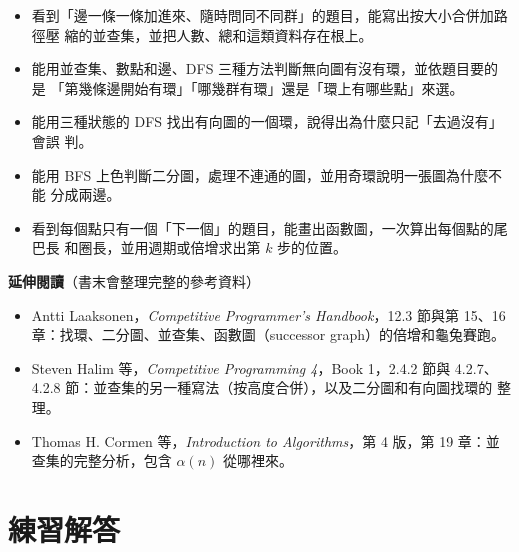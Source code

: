\begin{itemize}
\item 看到「邊一條一條加進來、隨時問同不同群」的題目，能寫出按大小合併加路徑壓
縮的並查集，並把人數、總和這類資料存在根上。
\item 能用並查集、數點和邊、DFS 三種方法判斷無向圖有沒有環，並依題目要的是
「第幾條邊開始有環」「哪幾群有環」還是「環上有哪些點」來選。
\item 能用三種狀態的 DFS 找出有向圖的一個環，說得出為什麼只記「去過沒有」會誤
判。
\item 能用 BFS 上色判斷二分圖，處理不連通的圖，並用奇環說明一張圖為什麼不能
分成兩邊。
\item 看到每個點只有一個「下一個」的題目，能畫出函數圖，一次算出每個點的尾巴長
和圈長，並用週期或倍增求出第 $k$ 步的位置。
\end{itemize}

\textbf{延伸閱讀}（書末會整理完整的參考資料）

\begin{itemize}
\item Antti Laaksonen，\textit{Competitive Programmer's Handbook}，12.3 節與第
15、16 章：找環、二分圖、並查集、函數圖（successor graph）的倍增和龜兔賽跑。
\item Steven Halim 等，\textit{Competitive Programming 4}，Book 1，2.4.2 節與
4.2.7、4.2.8 節：並查集的另一種寫法（按高度合併），以及二分圖和有向圖找環的
整理。
\item Thomas H. Cormen 等，\textit{Introduction to Algorithms}，第 4 版，第 19
章：並查集的完整分析，包含 $\alpha(n)$ 從哪裡來。
\end{itemize}

\section*{練習解答}

